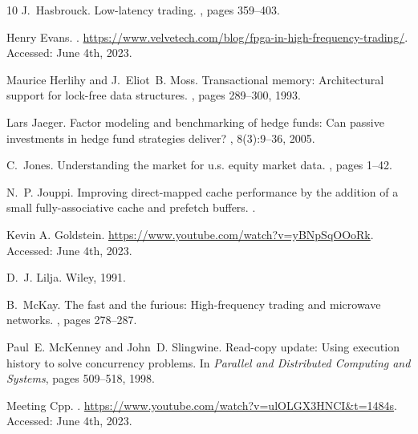 \documentclass{article}
\theoremstyle{break}
\begin{document}
\begin{thebibliography}{10}
J.~Hasbrouck.
\newblock Low-latency trading.
, pages 359--403.

{Henry Evans}.
.
\newblock \url{https://www.velvetech.com/blog/fpga-in-high-frequency-trading/}.
\newblock Accessed: June 4th, 2023.

Maurice Herlihy and J.~Eliot~B. Moss.
\newblock Transactional memory: Architectural support for lock-free data structures.
, pages 289--300, 1993.

Lars Jaeger.
\newblock Factor modeling and benchmarking of hedge funds: Can passive investments in hedge fund strategies deliver?
, 8(3):9--36, 2005.

C.~Jones.
\newblock Understanding the market for u.s. equity market data.
, pages 1--42.

N.~P. Jouppi.
\newblock Improving direct-mapped cache performance by the addition of a small fully-associative cache and prefetch buffers.
.

{Kevin A. Goldstein}.
\newblock \url{https://www.youtube.com/watch?v=yBNpSqOOoRk}.
\newblock Accessed: June 4th, 2023.

D.~J. Lilja.
\newblock Wiley, 1991.

B.~McKay.
\newblock The fast and the furious: High-frequency trading and microwave networks.
, pages 278--287.

Paul~E. McKenney and John~D. Slingwine.
\newblock Read-copy update: Using execution history to solve concurrency problems.
\newblock In {\em Parallel and Distributed Computing and Systems}, pages 509--518, 1998.

{Meeting Cpp}.
.
\newblock \url{https://www.youtube.com/watch?v=ulOLGX3HNCI&t=1484s}.
\newblock Accessed: June 4th, 2023.


\end{thebibliography}
\end{document}
